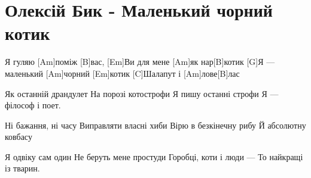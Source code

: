 \section{Олексій Бик - Маленький чорний котик}
\begin{guitar}
[Em]Я гуляю [Am]поміж [B]вас,
[Em]Ви для мене [Am]як нар[B]котик
[G]Я — маленький [Am]чорний [Em]котик
[C]Шалапут і [Am]лове[B]лас

Як останній драндулет
На порозі котострофи
Я пишу останні строфи
Я — філософ і поет.

Ні бажання, ні часу
Виправляти власні хиби
Вірю в безкінечну рибу 
Й абсолютну ковбасу

Я одвіку сам один
Не беруть мене простуди
Горобці, коти і люди —
То найкращі із тварин.
\end{guitar}
